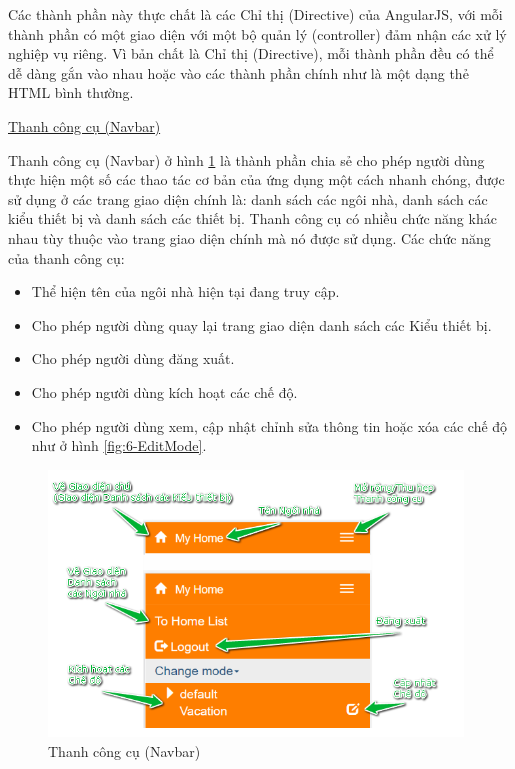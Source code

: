 \documentclass[12pt,a4paper,oneside]{extbook}
\begin{document}
\noindent
Các thành phần này thực chất là các Chỉ thị (Directive) của AngularJS, với mỗi thành phần có một giao diện với một bộ quản lý (controller) đảm nhận các xử lý nghiệp vụ riêng. Vì bản chất là Chỉ thị (Directive), mỗi thành phần đều có thể dễ dàng gắn vào nhau hoặc vào các thành phần chính như là một dạng thẻ HTML bình thường.

\noindent
\underline{Thanh công cụ (Navbar)}

\noindent
Thanh công cụ (Navbar) ở hình \ref{fig:6-navbar} là thành phần chia sẻ cho phép người dùng thực hiện một số các thao tác cơ bản của ứng dụng một cách nhanh chóng, được sử dụng ở các trang giao diện chính là: danh sách các ngôi nhà, danh sách các kiểu thiết bị và danh sách các thiết bị. Thanh công cụ có nhiều chức năng khác nhau tùy thuộc vào trang giao diện chính mà nó được sử dụng. Các chức năng của thanh công cụ:

\begin{itemize}[topsep=1mm,itemsep=-0.5mm]
\item Thể hiện tên của ngôi nhà hiện tại đang truy cập.
\item Cho phép người dùng quay lại trang giao diện danh sách các Kiểu thiết bị.
\item Cho phép người dùng đăng xuất.
\item Cho phép người dùng kích hoạt các chế độ.
\item Cho phép người dùng xem, cập nhật chỉnh sửa thông tin hoặc xóa các chế độ như ở hình \ref{fig:6-EditMode}.
\vspace{1mm}
\end{itemize}

\begin{figure}[h]
  \centering
     \includegraphics[width=11cm]{6-navbar}
  \caption{Thanh công cụ (Navbar)}\label{fig:6-navbar}
\end{figure}
\end{document}
